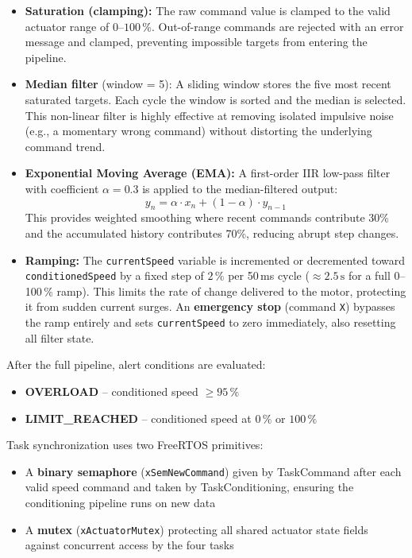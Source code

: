 \begin{itemize}
  \item \textbf{Saturation (clamping):} The raw command value is clamped to the valid
    actuator range of $0$--$100\,\%$. Out-of-range commands are rejected with an error
    message and clamped, preventing impossible targets from entering the pipeline.
  \item \textbf{Median filter} (window = 5): A sliding window stores the five most
    recent saturated targets. Each cycle the window is sorted and the median is selected.
    This non-linear filter is highly effective at removing isolated impulsive noise
    (e.g., a momentary wrong command) without distorting the underlying command trend.
  \item \textbf{Exponential Moving Average (EMA):} A first-order IIR low-pass filter
    with coefficient $\alpha = 0.3$ is applied to the median-filtered output:
    \[
      y_n = \alpha \cdot x_n + (1 - \alpha) \cdot y_{n-1}
    \]
    This provides weighted smoothing where recent commands contribute 30\% and the
    accumulated history contributes 70\%, reducing abrupt step changes.
  \item \textbf{Ramping:} The \texttt{currentSpeed} variable is incremented or
    decremented toward \texttt{conditionedSpeed} by a fixed step of $2\,\%$ per 50\,ms
    cycle ($\approx 2.5\,\mathrm{s}$ for a full 0--100\,\% ramp). This limits the
    rate of change delivered to the motor, protecting it from sudden current surges.
    An \textbf{emergency stop} (command \texttt{X}) bypasses the ramp entirely and
    sets \texttt{currentSpeed} to zero immediately, also resetting all filter state.
\end{itemize}

After the full pipeline, alert conditions are evaluated:
\begin{itemize}
  \item \textbf{OVERLOAD} -- conditioned speed $\geq 95\,\%$
  \item \textbf{LIMIT\_REACHED} -- conditioned speed at $0\,\%$ or $100\,\%$
\end{itemize}

Task synchronization uses two FreeRTOS primitives:
\begin{itemize}
  \item A \textbf{binary semaphore} (\texttt{xSemNewCommand}) given by TaskCommand
    after each valid speed command and taken by TaskConditioning, ensuring the
    conditioning pipeline runs on new data
  \item A \textbf{mutex} (\texttt{xActuatorMutex}) protecting all shared actuator
    state fields against concurrent access by the four tasks
\end{itemize}

